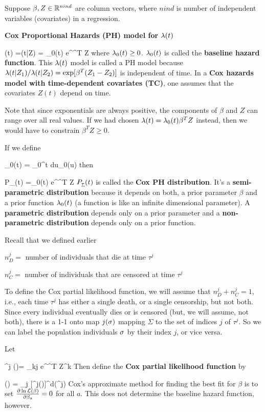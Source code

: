 Suppose $\beta, Z\in { \mathbb{R}}^{nind}$ are
column vectors, where $nind$ is
number of independent variables (covariates)
in a regression.

{\bf Cox Proportional Hazards (PH) model for
$\lambda(t)$}

\beq
\lam(t) =\lam(t|Z) = \lam_0(t) e^{\beta^T Z}
\eeq
where $\lambda_0(t)\geq 0$.
$\lambda_0(t)$
is called the {\bf baseline
hazard function}.
This $\lambda(t)$  model is called a
PH model because
$\lambda(t|Z_1)/\lambda(t|Z_2)=
\exp[\beta^T(Z_1-Z_2)]$
is independent of time.
In a {\bf Cox hazards model with time-dependent covariates (TC)},
one assumes that the covariates
$Z(t)$ depend on time.

Note that since exponentials
are always positive, the components
of $\beta$ and $Z$ can
range over all real values.
If we had chosen
$\lambda(t) = \lambda_0(t)\beta^T Z$
instead, then we would have
to constrain $\beta^TZ\geq 0$.

If we define

\beq
\Lambda_0(t) = \int_0^t du\;\lam_0(u)
\eeq
then

\beq
P_\rvtau(t) =\lam_0(t) e^{\beta^T Z} 
\eeq
$P_{\underline{\tau}}(t)$ is called the {\bf Cox PH distribution}.
It's a {\bf semi-parametric distribution}
because it depends on both, a prior
parameter $\beta$ and a prior function $\lambda_0(t)$
(a function is like an infinite dimensional parameter).
A {\bf parametric  distribution}
depends only on a prior parameter and
a {\bf non-parametric  distribution}
depends only on a prior function.

Recall that we defined earlier

$n_D^j=$ number of individuals
that die  at time $\tau^j$


$n_C^j=$ number of individuals
that are censored at time $\tau^j$


To define the Cox partial likelihood function,
we will assume that $n^j_D + n^j_C =1$, i.e.,
each time $\tau^j$ has either
a single death, or a single censorship, but not both.
Since every individual
eventually dies or is censored (but, we will assume, not both),
there is a 1-1 onto map $j(\sigma)$ mapping $\Sigma$ to the set
of indices $j$ of $\tau^j$. So we can label the population individuals
$\sigma$ by
their index $j$, or vice versa.

Let

\beq
\call^j (\beta)=
{\sum_{k\geq j} e^{\beta^T Z^{k}}}
\eeq
Then define the {\bf Cox partial likelihood function} by


\beq
\call(\beta) = \prod_j [\call^j(\beta)]^{{d(\tau^j})}
\eeq
Cox's approximate method for finding
the best fit for $\beta$
is to set $
\frac{\partial\ln {\cal L}(\beta)}{\partial\beta_a} =0$
for all $a$. This does not determine the
baseline hazard function, however.

